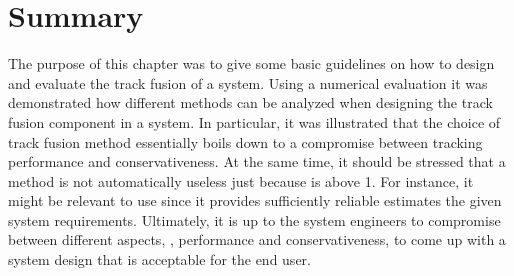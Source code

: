 \section{Summary}

The purpose of this chapter was to give some basic guidelines on how to design and evaluate the track fusion of a \abbrDTT system. Using a numerical evaluation it was demonstrated how different methods can be analyzed when designing the track fusion component in a \abbrDTT system. In particular, it was illustrated that the choice of track fusion method essentially boils down to a compromise between tracking performance and conservativeness. At the same time, it should be stressed that a method is not automatically useless just because \abbrCOIN is above 1. For instance, it might be relevant to use \abbrLE since it provides sufficiently reliable estimates \wrt the given \abbrDTT system requirements. Ultimately, it is up to the system engineers to compromise between different aspects, \eg, performance and conservativeness, to come up with a system design that is acceptable for the end user. 


